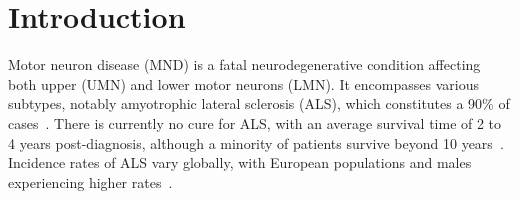 \chapter{Introduction}
\label{introduction}

%

Motor neuron disease (MND) is a fatal neurodegenerative condition affecting both upper (UMN) and lower motor neurons (LMN).
It encompasses various subtypes, notably amyotrophic lateral sclerosis (ALS), which constitutes a 90\% of cases~\cite{filippiMotorNeuronDiseases2015}.
There is currently no cure for ALS, with an average survival time of 2 to 4 years post-diagnosis, although a minority of patients survive beyond 10 years~\cite{swinnenPhenotypicVariabilityAmyotrophic2014,goutmanRecentAdvancesDiagnosis2022a,pupilloLongtermSurvivalAmyotrophic2014}.
Incidence rates of ALS vary globally, with European populations and males experiencing higher rates~\cite{marinVariationWorldwideIncidence2017,fontanaTimetrendEvolutionDeterminants2021}.


